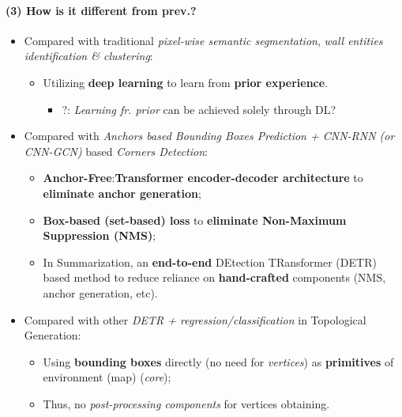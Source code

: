 \documentclass{article}
\begin{document}
\paragraph{(3) How is it different from prev.?}
\begin{itemize}
  \item Compared with traditional \textit{pixel-wise semantic segmentation}, \textit{wall entities identification \& clustering}:
  \begin{itemize}
    \item Utilizing \textbf{deep learning} to learn from \textbf{prior experience}. 
    \begin{itemize}
      \item ?: \textit{Learning fr. prior} can be achieved solely through DL?
    \end{itemize}
  \end{itemize}
  \item Compared with \textit{Anchors based Bounding Boxes Prediction + CNN-RNN (or CNN-GCN)} based \textit{Corners Detection}:
  \begin{itemize}
    \item \textbf{Anchor-Free}:\textbf{Transformer encoder-decoder architecture} to \textbf{eliminate anchor generation};
    \item \textbf{Box-based (set-based) loss} to \textbf{eliminate Non-Maximum Suppression (NMS)};
    \item In Summarization, an \textbf{end-to-end} DEtection TRansformer (DETR) based method to reduce reliance on \textbf{hand-crafted} components (NMS, anchor generation, etc).
  \end{itemize}
  \item Compared with other \textit{DETR + regression/classification} in Topological Generation:
  \begin{itemize}
    \item Using \textbf{bounding boxes} directly (no need for \textit{vertices}) as \textbf{primitives} of environment (map) (\textit{core});
    \item Thus, no \textit{post-processing components} for vertices obtaining.
  \end{itemize}
\end{itemize}
\end{document}
